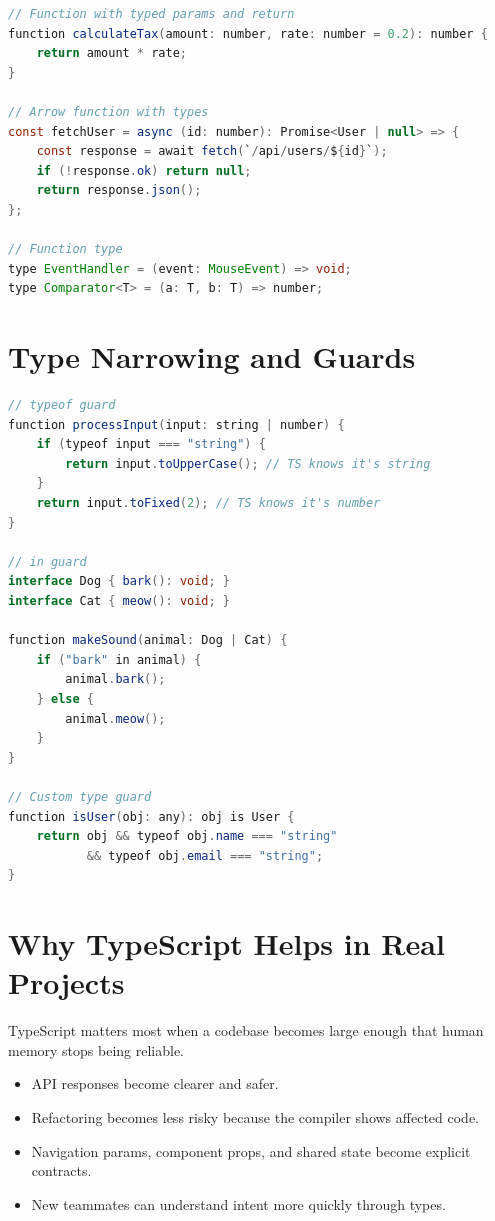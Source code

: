 \documentclass[12pt, a4paper, oneside]{book}
\begin{document}
\begin{lstlisting}[language=Java, caption={Typed functions}]
// Function with typed params and return
function calculateTax(amount: number, rate: number = 0.2): number {
    return amount * rate;
}

// Arrow function with types
const fetchUser = async (id: number): Promise<User | null> => {
    const response = await fetch(`/api/users/${id}`);
    if (!response.ok) return null;
    return response.json();
};

// Function type
type EventHandler = (event: MouseEvent) => void;
type Comparator<T> = (a: T, b: T) => number;
\end{lstlisting}

\section{Type Narrowing and Guards}

\begin{lstlisting}[language=Java, caption={Type narrowing}]
// typeof guard
function processInput(input: string | number) {
    if (typeof input === "string") {
        return input.toUpperCase(); // TS knows it's string
    }
    return input.toFixed(2); // TS knows it's number
}

// in guard
interface Dog { bark(): void; }
interface Cat { meow(): void; }

function makeSound(animal: Dog | Cat) {
    if ("bark" in animal) {
        animal.bark();
    } else {
        animal.meow();
    }
}

// Custom type guard
function isUser(obj: any): obj is User {
    return obj && typeof obj.name === "string"
           && typeof obj.email === "string";
}
\end{lstlisting}

\section{Why TypeScript Helps in Real Projects}

TypeScript matters most when a codebase becomes large enough that human memory stops being reliable.

\begin{itemize}[leftmargin=2em]
    \item API responses become clearer and safer.
    \item Refactoring becomes less risky because the compiler shows affected code.
    \item Navigation params, component props, and shared state become explicit contracts.
    \item New teammates can understand intent more quickly through types.
\end{itemize}
\end{document}
